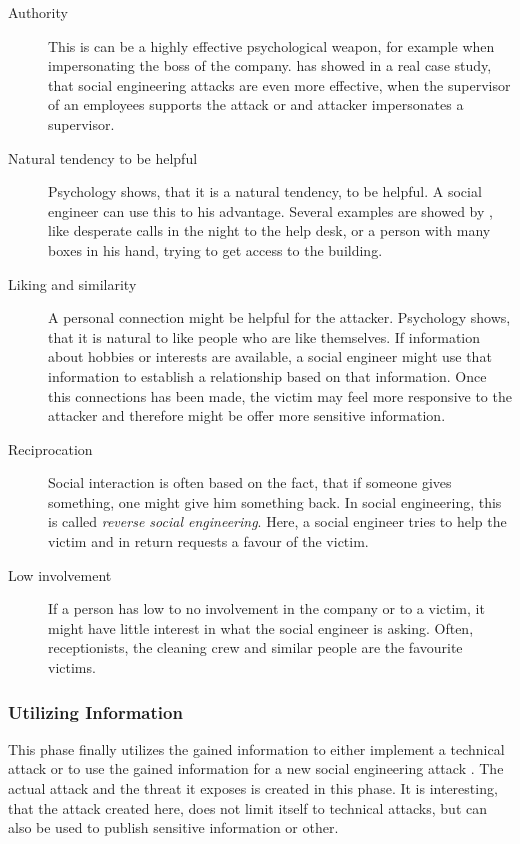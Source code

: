 \begin{description}
\item[Authority] This is can be a highly effective psychological weapon, for
  example when impersonating the boss of the company. \cite{orgill2004} has
  showed in a real case study, that social engineering attacks are even more
  effective, when the supervisor of an employees supports the attack or and
  attacker impersonates a supervisor.
\item[Natural tendency to be helpful] Psychology shows, that it is a natural
  tendency, to be helpful. A social engineer can use this to his advantage.
  Several examples are showed by \cite{mitnick2003}, like desperate calls in
  the night to the help desk, or a person with many boxes in his hand, trying
  to get access to the building.
\item[Liking and similarity] A personal connection might be helpful for the
  attacker. Psychology shows, that it is natural to like people who are like
  themselves. If information about hobbies or interests are available, a social
  engineer might use that information to establish a relationship based on that
  information. Once this connections has been made, the victim may feel more
  responsive to the attacker and therefore might be offer more sensitive
  information.
\item[Reciprocation] Social interaction is often based on the fact, that if
  someone gives something, one might give him something back. In social
  engineering, this is called \textit{reverse social engineering}. Here, a
  social engineer tries to help the victim and in return requests a favour of
  the victim.
\item[Low involvement] If a person has low to no involvement in the company or
  to a victim, it might have little interest in what the social engineer is
  asking. Often, receptionists, the cleaning crew and similar people are the
  favourite victims.
\end{description}

\subsubsection{Utilizing Information}

This phase finally utilizes the gained information to either implement a
technical attack or to use the gained information for a new social engineering
attack \cite{thornburgh2004}. The actual attack and the threat it exposes is
created in this phase. It is interesting, that the attack created here, does
not limit itself to technical attacks, but can also be used to publish
sensitive information or other.

